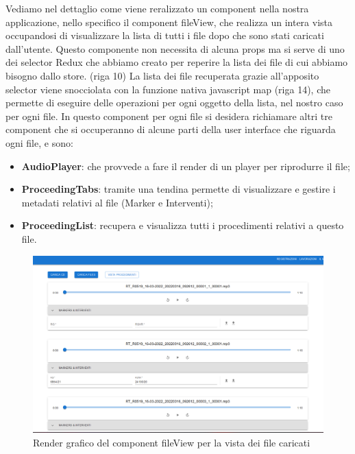 Vediamo nel dettaglio come viene reralizzato un component nella nostra applicazione, nello specifico il component fileView, che realizza un intera vista occupandosi di visualizzare
la lista di tutti i file dopo che sono stati caricati dall'utente.
Questo componente non necessita di alcuna props ma si serve di uno dei selector Redux che abbiamo creato per reperire la lista dei file di cui abbiamo bisogno dallo store. (riga 10)
La lista dei file recuperata grazie all'apposito selector viene snocciolata con la funzione nativa javascript map (riga 14), che permette di eseguire delle operazioni per ogni
oggetto della lista, nel nostro caso per ogni file. In questo component per ogni file si desidera richiamare altri tre component che si occuperanno di alcune parti
della user interface che riguarda ogni file, e sono:
\begin{itemize}
  \item \textbf{AudioPlayer}: che provvede a fare il render di un player per riprodurre il file;
  \item \textbf{ProceedingTabs}: tramite una tendina permette di visualizzare e gestire i metadati relativi al file (Marker e Interventi);
  \item \textbf{ProceedingList}: recupera e visualizza tutti i procedimenti relativi a questo file.
\end{itemize}

\newpage

\begin{figure}[H]
  \centering
  \includegraphics[width=\textwidth]{immagini/fileView-render.png}
  \caption{Render grafico del component fileView per la vista dei file caricati}
\end{figure}

